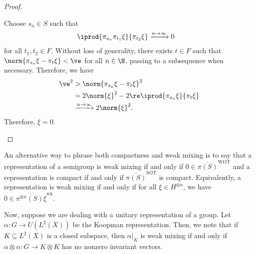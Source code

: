 \documentclass[10pt]{mypackage}
\begin{document}
\begin{proof}
\begin{enumerate}[(i)]
      Choose $s_n\in S$ such that
      \begin{align*}
        \iprod{\pi_{s_n}\pi_{t_1}\xi}{\pi_{t_2}\xi} &\xrightarrow{n\to\infty} 0
      \end{align*}
      for all $t_1,t_2\in F$. Without loss of generality, there exists $t\in F$ such that $\norm{\pi_{s_n}\xi - \pi_t\xi} < \ve$ for all $n\in \N$, passing to a subsequence when necessary. Therefore, we have
      \begin{align*}
        \ve^2 &> \norm{\pi_{s_n}\xi - \pi_t\xi}^2\\
              &= 2\norm{\xi}^2 - 2\re \iprod{\pi_{s_n}\xi}{\pi_{t}\xi}\\
              &\xrightarrow{n\to\infty} 2\norm{\xi}^2.
      \end{align*}
      Therefore, $\xi = 0$.
  \end{enumerate}
\end{proof}
An alternative way to phrase both compactness and weak mixing is to say that a representation of a semigroup is weak mixing if and only if $0\in \overline{\pi(S)}^{\operatorname{WOT}}$ and a representation is compact if and only if $ \overline{\pi(S)}^{\operatorname{SOT}} $ is compact. Equivalently, a representation is weak mixing if and only if for all $\xi\in H^{\oplus n}$, we have $0\in \overline{\pi^{\oplus n}(S)\xi}^{\operatorname{wk}}$.

Now, suppose we are dealing with a unitary representation of a group. Let $\alpha\colon G\to U\left( L^2\left( X \right) \right)$ be the Koopman representation. Then, we note that if $K\subseteq L^2(X)$ is a closed subspace, then $\alpha|_{K}$ is weak mixing if and only if $\alpha\otimes \alpha\colon G\to K\otimes K$ has no nonzero invariant vectors.
\end{document}
